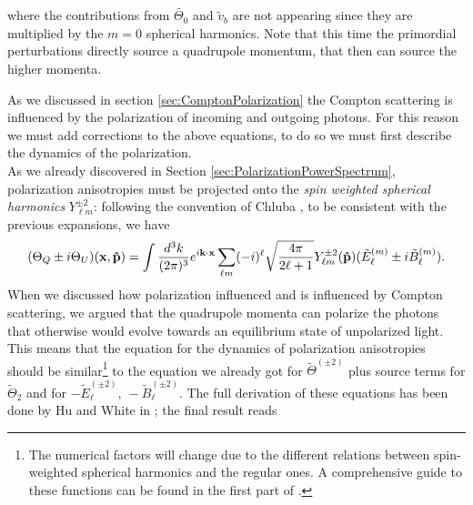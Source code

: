 where the contributions from $\tilde{\Theta_0}$ and $\tilde v_b$ are not appearing since they are multiplied by the $m=0$ spherical harmonics. Note that this time the primordial perturbations directly source a quadrupole momentum, that then can source the higher momenta.

As we discussed in section \ref{sec:ComptonPolarization} the Compton scattering is influenced by the polarization of incoming and outgoing photons. For this reason we must add corrections to the above equations, to do so we must first describe the dynamics of the polarization.\\ As we already discovered in Section \ref{sec:PolarizationPowerSpectrum}, polarization anisotropies must be projected onto the \emph{spin weighted spherical harmonics} $Y^{\pm2}_{\ell m}$: following the convention of Chluba \cite{Chluba_tens_diss}, to be consistent with the previous expansions, we have
\begin{equation*}
    (\Theta_Q\pm i\Theta_U)(\mathbf{x,\mathbf{\hat{p}}})=\int\frac{d^3k}{(2\pi)^3}e^{i\mathbf{k}\cdot\mathbf{x}}\sum_{\ell m} (-i)^{\ell}\sqrt{\frac{4\pi}{2\ell+1}}Y^{\pm2}_{\ell m}(\mathbf{\hat{p}})(\tilde E_{\ell}^{(m)}\pm i\tilde B_\ell^{(m)}).
\end{equation*}
 When we discussed how polarization influenced and is influenced by Compton scattering, we argued that the quadrupole momenta can polarize the photons that otherwise would evolve towards an equilibrium state of unpolarized light. This means that the equation for the dynamics of polarization anisotropies should be similar\footnote{The numerical factors will change due to the different relations between spin-weighted spherical harmonics and the regular ones. A comprehensive guide to these functions can be found in the first part of \cite{HuWhite}.} to the equation we already got for $\tilde\Theta^{(\pm2)}$ plus source terms for $\tilde\Theta_2$ and for $-\tilde E_{\ell}^{(\pm2)},\ -\tilde B_{\ell}^{(\pm2)}$. The full derivation of these equations has been done by Hu and White in \cite{HuWhite}; the final result reads
